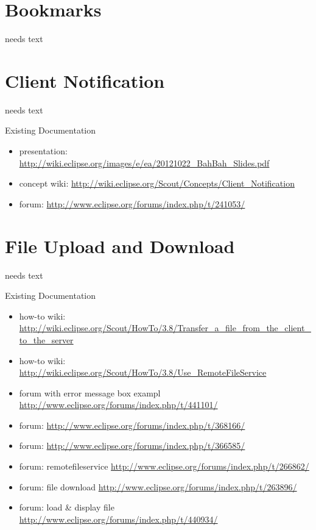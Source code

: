 \documentclass[a4paper,10pt,twoside]{book}
\begin{document}
\chapter{Bookmarks}
needs text

\chapter{Client Notification}
needs text

\noindent Existing Documentation
\begin{itemize}
  \item presentation: \url{http://wiki.eclipse.org/images/e/ea/20121022_BahBah_Slides.pdf}
  \item concept wiki: \url{http://wiki.eclipse.org/Scout/Concepts/Client_Notification}
  \item forum: \url{http://www.eclipse.org/forums/index.php/t/241053/}
\end{itemize}
      
\chapter{File Upload and Download}
needs text

\noindent Existing Documentation
\begin{itemize}
  \item how-to wiki: \url{http://wiki.eclipse.org/Scout/HowTo/3.8/Transfer_a_file_from_the_client_to_the_server}
  \item how-to wiki: \url{http://wiki.eclipse.org/Scout/HowTo/3.8/Use_RemoteFileService}
  \item forum with error message box exampl \url{http://www.eclipse.org/forums/index.php/t/441101/}
  \item forum: \url{http://www.eclipse.org/forums/index.php/t/368166/}
  \item forum: \url{http://www.eclipse.org/forums/index.php/t/366585/}
  \item forum: remotefileservice \url{http://www.eclipse.org/forums/index.php/t/266862/}
  \item forum: file download \url{http://www.eclipse.org/forums/index.php/t/263896/}
  \item forum: load \& display file \url{http://www.eclipse.org/forums/index.php/t/440934/}
\end{itemize}
\end{document}
